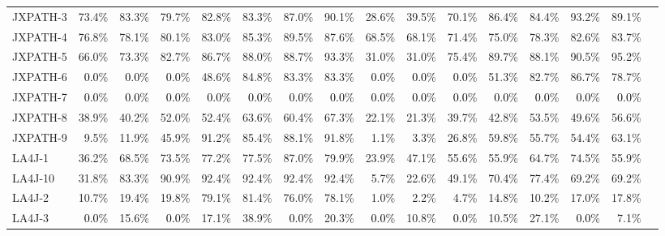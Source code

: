 \begin{tabular}{ l rrrrrrr rrrrrrrr}
JXPATH-3 & 73.4\% & 83.3\% & 79.7\% & 82.8\% & 83.3\% & 87.0\% & 90.1\% & 28.6\% & 39.5\% & 70.1\% & 86.4\% & 84.4\% & 93.2\% & 89.1\%\\ 
JXPATH-4 & 76.8\% & 78.1\% & 80.1\% & 83.0\% & 85.3\% & 89.5\% & 87.6\% & 68.5\% & 68.1\% & 71.4\% & 75.0\% & 78.3\% & 82.6\% & 83.7\%\\ 
JXPATH-5 & 66.0\% & 73.3\% & 82.7\% & 86.7\% & 88.0\% & 88.7\% & 93.3\% & 31.0\% & 31.0\% & 75.4\% & 89.7\% & 88.1\% & 90.5\% & 95.2\%\\ 
JXPATH-6 & \cellcolor{light-gray} \textcolor{black}{0.0}\% & \cellcolor{light-gray} \textcolor{black}{0.0}\% & \cellcolor{light-gray} \textcolor{black}{0.0}\% & 48.6\% & 84.8\% & 83.3\% & 83.3\% & \cellcolor{light-gray} \textcolor{black}{0.0}\% & \cellcolor{light-gray} \textcolor{black}{0.0}\% & \cellcolor{light-gray} \textcolor{black}{0.0}\% & 51.3\% & 82.7\% & 86.7\% & 78.7\%\\ 
JXPATH-7 & \cellcolor{light-gray} \textcolor{black}{0.0}\% & \cellcolor{light-gray} \textcolor{black}{0.0}\% & \cellcolor{light-gray} \textcolor{black}{0.0}\% & \cellcolor{light-gray} \textcolor{black}{0.0}\% & \cellcolor{light-gray} \textcolor{black}{0.0}\% & \cellcolor{light-gray} \textcolor{black}{0.0}\% & \cellcolor{light-gray} \textcolor{black}{0.0}\% & \cellcolor{light-gray} \textcolor{black}{0.0}\% & \cellcolor{light-gray} \textcolor{black}{0.0}\% & \cellcolor{light-gray} \textcolor{black}{0.0}\% & \cellcolor{light-gray} \textcolor{black}{0.0}\% & \cellcolor{light-gray} \textcolor{black}{0.0}\% & \cellcolor{light-gray} \textcolor{black}{0.0}\% & \cellcolor{light-gray} \textcolor{black}{0.0}\%\\ 
JXPATH-8 & 38.9\% & 40.2\% & 52.0\% & 52.4\% & 63.6\% & 60.4\% & 67.3\% & 22.1\% & 21.3\% & 39.7\% & 42.8\% & 53.5\% & 49.6\% & 56.6\%\\ 
JXPATH-9 & 9.5\% & 11.9\% & 45.9\% & 91.2\% & 85.4\% & 88.1\% & 91.8\% & 1.1\% & 3.3\% & 26.8\% & 59.8\% & 55.7\% & 54.4\% & 63.1\%\\ 
LA4J-1 & 36.2\% & 68.5\% & 73.5\% & 77.2\% & 77.5\% & 87.0\% & 79.9\% & 23.9\% & 47.1\% & 55.6\% & 55.9\% & 64.7\% & 74.5\% & 55.9\%\\ 
LA4J-10 & 31.8\% & 83.3\% & 90.9\% & 92.4\% & 92.4\% & 92.4\% & 92.4\% & 5.7\% & 22.6\% & 49.1\% & 70.4\% & 77.4\% & 69.2\% & 69.2\%\\ 
LA4J-2 & 10.7\% & 19.4\% & 19.8\% & 79.1\% & 81.4\% & 76.0\% & 78.1\% & 1.0\% & 2.2\% & 4.7\% & 14.8\% & 10.2\% & 17.0\% & 17.8\%\\ 
LA4J-3 & \cellcolor{light-gray} \textcolor{black}{0.0}\% & 15.6\% & \cellcolor{light-gray} \textcolor{black}{0.0}\% & 17.1\% & 38.9\% & \cellcolor{light-gray} \textcolor{black}{0.0}\% & 20.3\% & \cellcolor{light-gray} \textcolor{black}{0.0}\% & 10.8\% & \cellcolor{light-gray} \textcolor{black}{0.0}\% & 10.5\% & 27.1\% & \cellcolor{light-gray} \textcolor{black}{0.0}\% & 7.1\%\\ 

\end{tabular}
